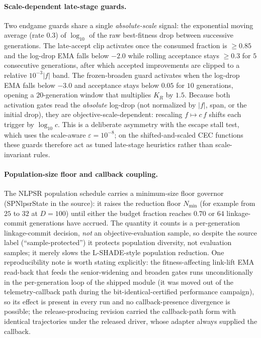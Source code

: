 \documentclass[algorithms,article,submit,moreauthors,pdftex]{Definitions/mdpi}
\begin{document}
\paragraph{Scale-dependent late-stage guards.}
Two endgame guards share a single \emph{absolute-scale} signal: the exponential moving
average (rate $0.3$) of $\log_{10}$ of the raw best-fitness drop between successive
generations.  The late-accept clip activates once the consumed fraction is $\ge 0.85$ and
the log-drop EMA falls below $-2.0$ while rolling acceptance stays $\ge 0.3$ for $5$
consecutive generations, after which accepted improvements are clipped to a relative
$10^{-3}\lvert f\rvert$ band.  The frozen-broaden guard activates when the log-drop EMA
falls below $-3.0$ and acceptance stays below $0.05$ for $10$ generations, opening a
$20$-generation window that multiplies $K_R$ by $1.5$.  Because both activation gates
read the \emph{absolute} log-drop (not normalized by $\lvert f\rvert$, span, or the
initial drop), they are objective-scale-dependent: rescaling $f\mapsto c\,f$ shifts each
trigger by $\log_{10} c$.  This is a deliberate asymmetry with the escape stall test,
which uses the scale-aware $\varepsilon=10^{-8}$; on the shifted-and-scaled CEC functions
these guards therefore act as tuned late-stage heuristics rather than scale-invariant
rules.

\paragraph{Population-size floor and callback coupling.}
The NLPSR population schedule carries a minimum-size floor governor
(SPNlpsrState in the source): it raises the reduction floor $N_{\min}$ (for
example from $25$ to $32$ at $D=100$) until either the budget fraction reaches $0.70$ or
$64$ linkage-commit generations have accrued.  The quantity it counts is a per-generation
linkage-commit decision, \emph{not} an objective-evaluation sample, so despite the source
label (``sample-protected'') it protects population diversity, not evaluation samples;
it merely slows the L-SHADE-style population reduction.  One reproducibility note is
worth stating explicitly: the fitness-affecting link-lift EMA read-back that feeds the
senior-widening and broaden gates runs unconditionally in the per-generation loop of the
shipped module (it was moved out of the telemetry-callback path during the
bit-identical-certified performance campaign), so its effect is present in every run and
no callback-presence divergence is possible; the release-producing revision carried the
callback-path form with identical trajectories under the released driver, whose adapter
always supplied the callback.
\end{document}
